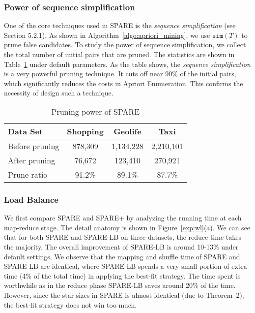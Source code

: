 \subsubsection{Power of sequence simplification}
One of the core techniques used in SPARE is the \emph{sequence simplification} (see Section 5.2.1). 
As shown in  Algorithm~\ref{algo:apriori_mining}, we use $\mathtt{sim}(T)$
to prune false candidates. To study the power of sequence simplification,
we collect the total number of initial pairs that are pruned. The
statistics are shown in Table~\ref{tbl:pruning} under default parameters. As the table
shows, the \emph{sequence simplification} is a very powerful pruning technique.
It cuts off near 90\% of the initial pairs, which significantly reduces the costs
in Apriori Enumeration. This confirms the necessity of design such a technique.
\begin{table}[h]
\begin{tabular}{|l|c|c|c|}
\hline 
\textbf{Data Set} & \textbf{Shopping} & \textbf{Geolife} & \textbf{Taxi} \\ 
\hline 
Before pruning & 878,309 &  1,134,228 & 2,210,101 \\ 
\hline 
After pruning & 76,672 & 123,410 & 270,921 \\ 
\hline 
Prune ratio & 91.2\% & 89.1\% & 87.7\% \\ 
\hline 
\end{tabular} 
%
\caption{Pruning power of SPARE}
\label{tbl:pruning}
\end{table}


\subsubsection{Load Balance}
We first compare SPARE and SPARE+ by analyzing the running time at
each map-reduce stage. The detail anatomy is shown in Figure~\ref{exp:wl}(a).
We can see that for both SPARE and SPARE-LB on three datasets, the reduce 
time takes the majority. The overall improvement of SPARE-LB is around 10-13\%
under default settings. We observe that the mapping and shuffle time
of SPARE and SPARE-LB are identical, where SPARE-LB spends a very small portion 
of extra time (4\% of the total time)
in applying the best-fit strategy. The time spent is worthwhile
as in the reduce phase SPARE-LB saves around 20\% of the time. However, since 
the star sizes in SPARE is almost identical (due to Theorem~2), the best-fit
strategy does not win too much.

